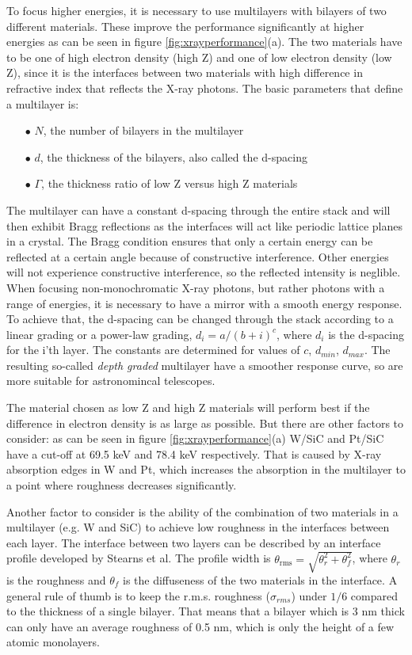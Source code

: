 To focus higher energies, it is necessary to use multilayers with bilayers of two different materials. These improve the performance significantly at higher energies as can be seen in figure \ref{fig:xrayperformance}(a). The two materials have to be one of high electron density (high Z) and one of low electron density (low Z), since it is the interfaces between two materials with high difference in refractive index that reflects the X-ray photons. The basic parameters that define a multilayer is:

\begin{itemize}
	\item[$\bullet$] $N$, the number of bilayers in the multilayer
	\item[$\bullet$] $d$, the thickness of the bilayers, also called the d-spacing
	\item[$\bullet$] $\Gamma$, the thickness ratio of low Z versus high Z materials
\end{itemize}

The multilayer can have a constant d-spacing through the entire stack and will then exhibit Bragg reflections as the interfaces will act like periodic lattice planes in a crystal. The Bragg condition ensures that only a certain energy can be reflected at a certain angle because of constructive interference. Other energies will not experience constructive interference, so the reflected intensity is neglible. When focusing non-monochromatic X-ray photons, but rather photons with a range of energies, it is necessary to have a mirror with a smooth energy response. To achieve that, the d-spacing can be changed through the stack according to a linear grading or a power-law grading\cite{Joensen:12je}, $d_i = a/(b+i)^c$, where $d_i$ is the d-spacing for the i'th layer. The constants are determined for values of $c$, $d_{min}$, $d_{max}$. The resulting so-called \emph{depth graded} multilayer have a smoother response curve, so are more suitable for astronomincal telescopes.

The material chosen as low Z and high Z materials will perform best if the difference in electron density is as large as possible. But there are other factors to consider: as can be seen in figure \ref{fig:xrayperformance}(a) W/SiC and Pt/SiC have a cut-off at 69.5 keV and 78.4 keV respectively. That is caused by X-ray absorption edges in W and Pt, which increases the absorption in the multilayer to a point where roughness decreases significantly.

Another factor to consider is the ability of the combination of two materials in a multilayer (e.g. W and SiC) to achieve low roughness in the interfaces between each layer. The interface between two layers can be described by an interface profile developed by Stearns et al\cite{Stearns:1989va}. The profile width is $\theta_{\text{rms}}=\sqrt{\theta_r^2 + \theta_f^2}$, where $\theta_r$ is the roughness and $\theta_f$ is the diffuseness of the two materials in the interface. A general rule of thumb is to keep the r.m.s. roughness ($\sigma_{rms}$) under $1/6$ compared to the thickness of a single bilayer. That means that a bilayer which is 3 nm thick can only have an average roughness of 0.5 nm, which is only the height of a few atomic monolayers.
